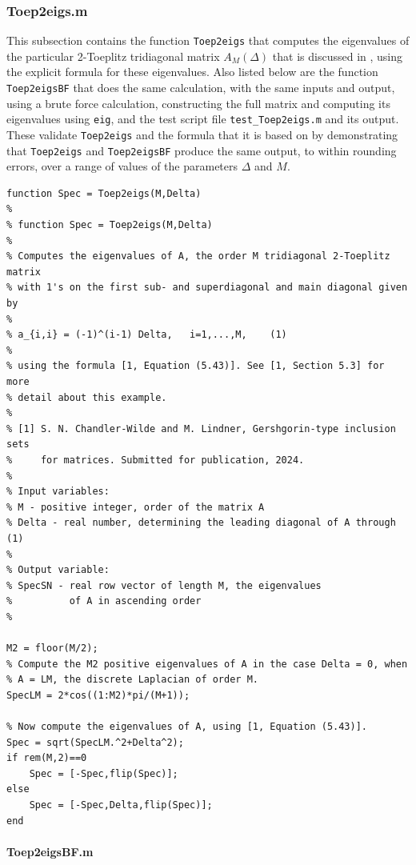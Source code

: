 \documentclass[preprint,1p,11pt]{elsarticle}
\numberwithin{equation}{section}   %
\numberwithin{figure}{section}  %
\begin{document}
\subsubsection{Toep2eigs.m}  \label{code:Toep2e}

This subsection contains the function \verb+Toep2eigs+ that computes the eigenvalues of the particular 2-Toeplitz tridiagonal matrix $A_M(\Delta)$ that is discussed in \cite[\S5.3]{CWL}, using the explicit formula \cite[(5.43)]{CWL} for these eigenvalues. Also listed below are the function  \verb+Toep2eigsBF+ that does the same calculation, with the same inputs and output, using a brute force calculation, constructing the full matrix and computing its eigenvalues using \verb+eig+, and the test script file \verb+test_Toep2eigs.m+ and its output. These validate  \verb+Toep2eigs+ and the formula \cite[(5.43)]{CWL} that it is based on by demonstrating that \verb+Toep2eigs+ and \verb+Toep2eigsBF+ produce the same output, to within rounding errors, over a range of values of the parameters $\Delta$ and $M$.

\begin{verbatim}
function Spec = Toep2eigs(M,Delta)
%
% function Spec = Toep2eigs(M,Delta)
%
% Computes the eigenvalues of A, the order M tridiagonal 2-Toeplitz matrix
% with 1's on the first sub- and superdiagonal and main diagonal given by
% 
% a_{i,i} = (-1)^(i-1) Delta,   i=1,...,M,    (1)
% 
% using the formula [1, Equation (5.43)]. See [1, Section 5.3] for more 
% detail about this example.
%
% [1] S. N. Chandler-Wilde and M. Lindner, Gershgorin-type inclusion sets
%     for matrices. Submitted for publication, 2024.
%
% Input variables:
% M - positive integer, order of the matrix A
% Delta - real number, determining the leading diagonal of A through (1)
%
% Output variable:
% SpecSN - real row vector of length M, the eigenvalues 
%          of A in ascending order 
%

M2 = floor(M/2);
% Compute the M2 positive eigenvalues of A in the case Delta = 0, when
% A = LM, the discrete Laplacian of order M.
SpecLM = 2*cos((1:M2)*pi/(M+1));

% Now compute the eigenvalues of A, using [1, Equation (5.43)].
Spec = sqrt(SpecLM.^2+Delta^2);
if rem(M,2)==0
    Spec = [-Spec,flip(Spec)];
else
    Spec = [-Spec,Delta,flip(Spec)];
end
\end{verbatim}

\paragraph{Toep2eigsBF.m}
\end{document}
